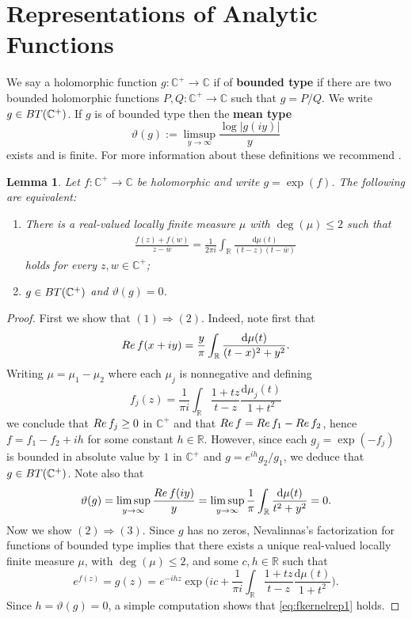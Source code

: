 \documentclass[a4paper,reqno,12pt]{amsart}
\newtheorem{lemma}[theorem]{Lemma}
\renewcommand{\H}{\mathbb{C}^+}
\renewcommand{\r}{\mathbb{R}}
\newcommand{\cp}{\mathbb{C}} %
\renewcommand{\d}{\mathrm{d}}
\newcommand{\w}{\ov{w}}
\newcommand{\1}{{\bf 1}}
\renewcommand{\emph}[1]{{\bf #1}}
\newcommand{\ov}[1]{\overline{#1}}
\newcommand{\bt}{{\rm BT}}
\renewcommand{\1}{{\bo 1}}
\renewcommand{\Re}{{\rm Re}\,}
\begin{document}
\section{Representations of Analytic Functions}\label{sec:rep}
We say a holomorphic function $g:\H\to\cp$ if of \emph{bounded type} if there are two bounded holomorphic functions $P,Q:\H \to\cp$ such that $g=P/Q$. We write $g\in \bt(\H)$. If $g$ is of bounded type then the \emph{mean type}
$$
\vartheta(g):=\limsup_{y\to\infty} \frac{\log|g(iy)|}{y}
$$
exists and is finite. For more information about these definitions we recommend \cite{dB,Ga}. 


\begin{lemma}\label{lem:condatinfty}
Let $f:\H\to\cp$ be holomorphic and write $g=\exp(f)$. The following are equivalent:
\begin{enumerate}
\item There is a real-valued locally finite measure $\mu$ with $\deg(\mu)\leq 2$ such that
\begin{align}\label{eq:fkernelrep1}
\frac{f(z)+\ov{f(w)}}{z-\ov w} =  \frac{1}{2\pi i}\int_\r  \frac{\d \mu(t)}{(t-z)(t-\w)}
\end{align}
holds for every $z,w\in \H$;
\item $g\in \bt(\H)$ and $\vartheta(g)=0$.
\end{enumerate}
\end{lemma}
\begin{proof}
First we show that $(1)\Rightarrow (2)$. Indeed, note first that
$$
\Re f(x+iy) = \frac{y}{\pi }\int_\r  \frac{\d \mu(t)}{(t-x)^2+y^2}.
$$
Writing $\mu=\mu_1-\mu_2$ where each $\mu_j$ is nonnegative and defining 
$$
f_j(z) = \frac{1}{\pi i} \int_\r \frac{1+tz}{t-z}\frac{\d \mu_j(t)}{1+t^2}
$$
we conclude that $\Re f_j \geq 0$ in $\H$ and that $\Re f = \Re f_1 - \Re f_2$, hence $f=f_1-f_2+ih$ for some constant $h\in \r$. However, since each $g_j=\exp(-f_j)$ is bounded in absolute value by $1$ in $\H$ and 
$g=e^{ih} g_2/g_1$, we deduce that $g\in \bt(\H)$. Note also that
$$
\vartheta(g) = \limsup_{y\to\infty} \frac{\Re f(iy)}{y} = \limsup_{y\to\infty} \frac{1}{\pi }\int_\r  \frac{\d \mu(t)}{t^2+y^2} = 0.
$$
Now we show $(2)\Rightarrow (3)$. Since $g$ has no zeros, Nevalinnas's factorization for functions of bounded type \cite[Theprem 9]{dB} implies that there exists a unique real-valued locally finite measure $\mu$, with $\deg(\mu)\leq 2$, and some $c,h\in \r$ such that
$$
e^{f(z)}=g(z) = e^{-ihz} \exp\bigg( ic +  \frac{1}{\pi i} \int_\r \frac{1+tz}{t-z}\frac{\d \mu(t)}{1+t^2} \bigg).
$$
Since $h=\vartheta(g)=0$, a simple computation shows that \eqref{eq:fkernelrep1} holds.
\end{proof}
\end{document}
